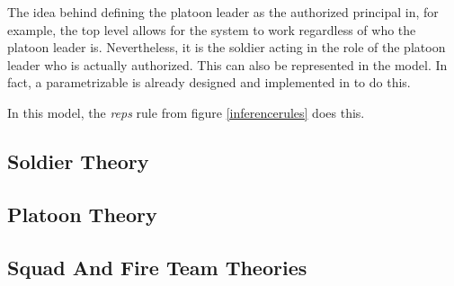 \documentclass[../../main/main.tex]{subfiles}
\begin{document}
The idea behind defining the platoon leader as the authorized principal in, for example, the top level  allows for the system to work regardless of who the platoon leader is.  Nevertheless, it is the soldier acting in the role of the platoon leader who is actually authorized.  This can also be represented in the  model.  In fact, a parametrizable  is already designed and implemented in  to do this.

In this model, the \textit{reps} rule from figure \ref{inferencerules} does this.  


\subsection{Soldier Theory}
\subsection{Platoon Theory}
\subsection{Squad And Fire Team Theories}
\end{document}
